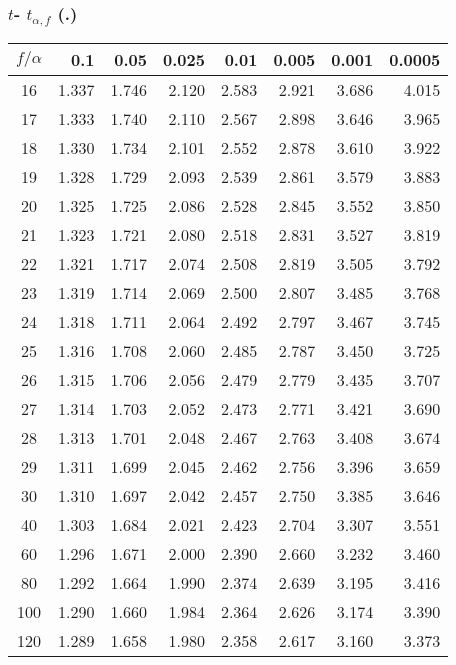 \documentclass{article}
\begin{document}
{\subsubsection*{ $t$- $t_{\alpha,f}$ (.)}
\medskip
\begin{tabular}{c|*{7}{r}}
$f /\alpha$  
    &   0.1  &  0.05  & 0.025  &  0.01  & 0.005  & 0.001  & 0.0005 \\\hline
 16 &  1.337 &  1.746 &  2.120 &  2.583 &  2.921 &  3.686 &  4.015 \\
 17 &  1.333 &  1.740 &  2.110 &  2.567 &  2.898 &  3.646 &  3.965 \\
 18 &  1.330 &  1.734 &  2.101 &  2.552 &  2.878 &  3.610 &  3.922 \\
 19 &  1.328 &  1.729 &  2.093 &  2.539 &  2.861 &  3.579 &  3.883 \\
 20 &  1.325 &  1.725 &  2.086 &  2.528 &  2.845 &  3.552 &  3.850 \\
 21 &  1.323 &  1.721 &  2.080 &  2.518 &  2.831 &  3.527 &  3.819 \\
 22 &  1.321 &  1.717 &  2.074 &  2.508 &  2.819 &  3.505 &  3.792 \\
 23 &  1.319 &  1.714 &  2.069 &  2.500 &  2.807 &  3.485 &  3.768 \\
 24 &  1.318 &  1.711 &  2.064 &  2.492 &  2.797 &  3.467 &  3.745 \\
 25 &  1.316 &  1.708 &  2.060 &  2.485 &  2.787 &  3.450 &  3.725 \\
 26 &  1.315 &  1.706 &  2.056 &  2.479 &  2.779 &  3.435 &  3.707 \\
 27 &  1.314 &  1.703 &  2.052 &  2.473 &  2.771 &  3.421 &  3.690 \\
 28 &  1.313 &  1.701 &  2.048 &  2.467 &  2.763 &  3.408 &  3.674 \\
 29 &  1.311 &  1.699 &  2.045 &  2.462 &  2.756 &  3.396 &  3.659 \\
 30 &  1.310 &  1.697 &  2.042 &  2.457 &  2.750 &  3.385 &  3.646 \\
 40 &  1.303 &  1.684 &  2.021 &  2.423 &  2.704 &  3.307 &  3.551 \\
 60 &  1.296 &  1.671 &  2.000 &  2.390 &  2.660 &  3.232 &  3.460 \\
 80 &  1.292 &  1.664 &  1.990 &  2.374 &  2.639 &  3.195 &  3.416 \\
100 &  1.290 &  1.660 &  1.984 &  2.364 &  2.626 &  3.174 &  3.390 \\
120 &  1.289 &  1.658 &  1.980 &  2.358 &  2.617 &  3.160 &  3.373 \\
\end{tabular}

}
\end{document}
